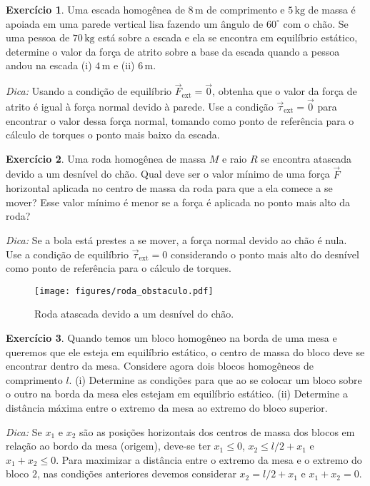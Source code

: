 \documentclass[12pt,a4paper]{article}
\theoremstyle{definition}
\newtheorem{ex}{Exercício}[section]
\begin{document}
\begin{ex}
  Uma escada homogênea de $8\,\mathrm{m}$ de comprimento e
  $5\,\mathrm{kg}$ de massa é apoiada em uma parede vertical lisa
  fazendo um ângulo de $60^\circ$ com o chão. Se uma pessoa de
  $70\,\mathrm{kg}$ está sobre a escada e ela se encontra em
  equilíbrio estático, determine o valor da força de atrito sobre a
  base da escada quando a pessoa andou na escada (i) $4\,\mathrm{m}$ e
  (ii) $6\,\mathrm{m}$.

  \noindent\textit{Dica:} Usando a condição de equilíbrio $\vec F_{\textrm{ext}}=\vec 0$, obtenha
  que o valor da força de atrito é igual à força normal devido à
  parede. Use a condição $\vec\tau_\textrm{ext}=\vec 0$ para encontrar o
  valor dessa força normal, tomando como ponto de referência para o
  cálculo de torques o ponto mais baixo da escada.
\end{ex}

\begin{ex}
  Uma roda homogênea de massa $M$ e raio $R$ se encontra atascada
  devido a um desnível do chão. Qual deve ser o valor mínimo de uma
  força $\vec F$ horizontal aplicada no centro de massa da roda para
  que a ela comece a se mover? Esse valor mínimo é menor se a força é
  aplicada no ponto mais alto da roda?

  \noindent\textit{Dica:} Se a bola está prestes a se mover, a força
  normal devido ao chão é nula. Use a condição de equilíbrio
  $\vec\tau_{\mathrm{ext}}=0$ considerando o ponto mais alto do
  desnível como ponto de referência para o cálculo de torques.
  \begin{figure}[t]
    \centering
    \texttt{[image: figures/roda\_obstaculo.pdf]}
    \caption{Roda atascada devido a um desnível do chão.}
    \label{fig:roda_obstaculo}
  \end{figure}
\end{ex}

\begin{ex}
  Quando temos um bloco homogêneo na borda de uma mesa e queremos que
  ele esteja em equilíbrio estático, o centro de massa do bloco deve
  se encontrar dentro da mesa. Considere agora dois blocos homogêneos
  de comprimento $l$. (i) Determine as condições para que ao se
  colocar um bloco sobre o outro na borda da mesa eles estejam em
  equilíbrio estático. (ii) Determine a distância máxima entre o
  extremo da mesa ao extremo do bloco superior.

  \noindent\textit{Dica:} Se $x_1$ e $x_2$ são as posições horizontais
  dos centros de massa dos blocos em relação ao bordo da mesa
  (origem), deve-se ter $x_1\le 0$, $x_2\le l/2+x_1$ e $x_1+x_2\le
  0$. Para maximizar a distância entre o extremo da mesa e o extremo
  do bloco $2$, nas condições anteriores devemos considerar
  $x_2=l/2+x_1$ e $x_1+x_2=0$.
\end{ex}
\end{document}
